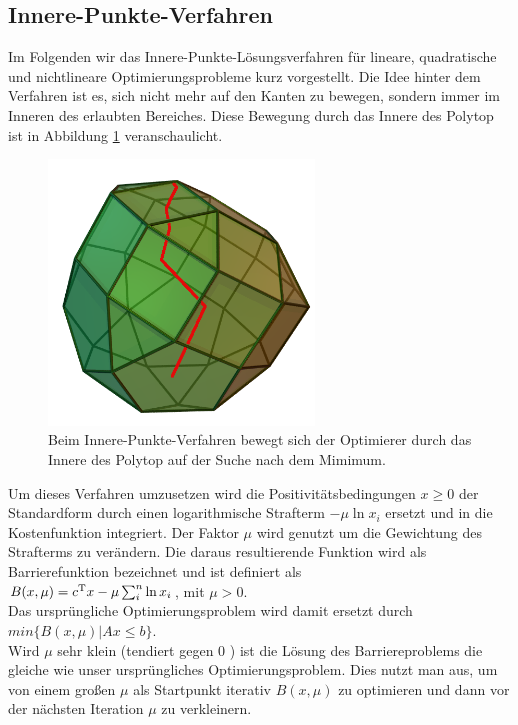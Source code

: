 \documentclass{like}
\begin{document}
\subsection{Innere-Punkte-Verfahren} 
\label{ipm} 
Im Folgenden wir das Innere-Punkte-Lösungsverfahren für lineare, quadratische und nichtlineare Optimierungsprobleme kurz vorgestellt. Die Idee hinter dem Verfahren ist es, sich nicht mehr auf den Kanten zu bewegen, sondern immer im Inneren des erlaubten Bereiches. Diese Bewegung durch das Innere des Polytop ist in Abbildung \ref{fig:iterPointMethod} veranschaulicht.  
\begin{figure}[ht!]
	\centering
	\includegraphics[width=200pt]{Abbildungen/iterPointMethod.png}
	\caption{Beim Innere-Punkte-Verfahren bewegt sich der Optimierer durch das Innere des Polytop auf der Suche nach dem Mimimum.}
	\label{fig:iterPointMethod}
\end{figure}

Um dieses Verfahren umzusetzen wird die Positivitätsbedingungen $x \geq 0$ der Standardform durch einen logarithmische Strafterm $-\mu \ln x_i $  ersetzt und in die Kostenfunktion integriert. 
Der Faktor $\mu$ wird genutzt um die Gewichtung des Strafterms zu verändern.
Die daraus resultierende Funktion wird als Barrierefunktion bezeichnet und ist definiert als \\
$B(x,\mu) =  c\textsuperscript{T}x - \mu \sum_{i}^{n} \ln x_i$, mit $\mu > 0$. \\
Das ursprüngliche Optimierungsproblem wird damit ersetzt durch 
$min \{B(x,\mu) | Ax \leq b\}$.\\
Wird \(\mu\) sehr klein (tendiert gegen \(0\) ) ist die Lösung des Barriereproblems die gleiche wie unser ursprüngliches Optimierungsproblem. Dies nutzt man aus, um von einem großen \(\mu\) als Startpunkt iterativ $B(x,\mu)$ zu optimieren und dann vor der nächsten Iteration \(\mu\) zu verkleinern.
\end{document}

